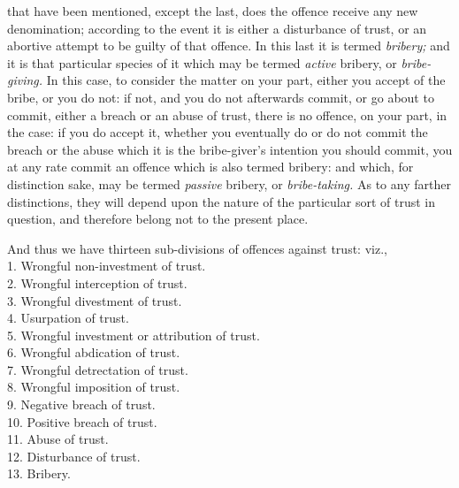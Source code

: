 \documentclass[12pt]{report}
\begin{document}
that have been mentioned, except the last, does the offence receive any
new denomination; according to the event it is either a disturbance of
trust, or an abortive attempt to be guilty of that offence. In this last
it is termed \emph{bribery;} and it is that particular species of it
which may be termed \emph{active} bribery, or \emph{bribe-giving.} In
this case, to consider the matter on your part, either you accept of the
bribe, or you do not: if not, and you do not afterwards commit, or go
about to commit, either a breach or an abuse of trust, there is no
offence, on your part, in the case: if you do accept it, whether you
eventually do or do not commit the breach or the abuse which it is the
bribe-giver's intention you should commit, you at any rate commit an
offence which is also termed bribery: and which, for distinction sake,
may be termed \emph{passive} bribery, or \emph{bribe-taking.} As to any
farther distinctions, they will depend upon the nature of the particular
sort of trust in question, and therefore belong not to the present
place.

And thus we have thirteen sub-divisions of offences against trust:
viz.,\\
1. Wrongful non-investment of trust.\\
2. Wrongful interception of trust.\\
3. Wrongful divestment of trust.\\
4. Usurpation of trust.\\
5. Wrongful investment or attribution of trust.\\
6. Wrongful abdication of trust.\\
7. Wrongful detrectation of trust.\\
8. Wrongful imposition of trust.\\
9. Negative breach of trust.\\
10. Positive breach of trust.\\
11. Abuse of trust.\\
12. Disturbance of trust.\\
13. Bribery.
\end{document}
